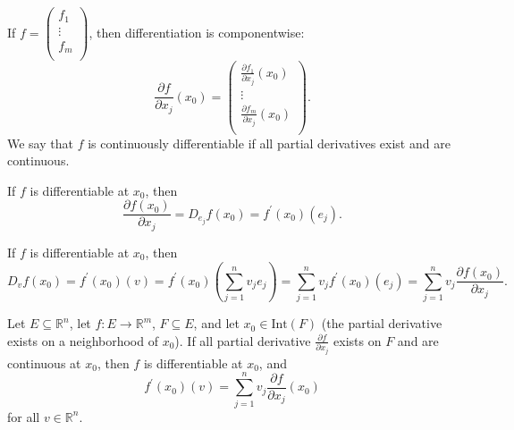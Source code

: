 \begin{remark}
    If \(f = \begin{pmatrix}
         f_1 \\
         \vdots \\
         f_m \\
    \end{pmatrix}\), then differentiation is componentwise: 
    \[
        \frac{\partial f}{\partial x_j} (x_0) = \begin{pmatrix}
             \frac{\partial f_1}{\partial x_j}(x_0)  \\
             \vdots \\
             \frac{\partial f_m}{\partial x_j} (x_0)  \\
        \end{pmatrix}. 
    \] 
    We say that \(f\) is continuously differentiable if all partial derivatives exist and are continuous. 
\end{remark}

\begin{remark}
    If \(f\) is differentiable at \(x_0\), then 
    \[
        \frac{\partial f(x_0)}{\partial x_j} = D_{e_j}f(x_0) = f^{\prime} (x_0) (e_j). 
    \]  
\end{remark}

\begin{remark}
    If \(f\) is differentiable at \(x_0\), then   
    \[
        D_v f(x_0) = f^{\prime} (x_0)(v) = f^{\prime} (x_0) \left( \sum_{j=1}^n v_j e_j  \right) = \sum_{j=1}^n v_j f^{\prime} (x_0)(e_j) = \sum_{j=1}^n v_j \frac{\partial f(x_0)}{\partial x_j}.    
    \]
\end{remark}

\begin{theorem} \label{thm: if f continuously differentiable then f differentiable}
    Let \(E \subseteq \mathbb{R} ^n\), let \(f : E \to \mathbb{R} ^m\), \(F \subseteq E\), and let \(x_0 \in \mathrm{Int}(F) \) (the partial derivative exists on a neighborhood of \(x_0\)). If all partial derivative \(\frac{\partial f}{\partial x_j} \) exists on \(F\) and are continuous at \(x_0\), then \(f\) is differentiable at \(x_0\), and 
    \[
        f^{\prime} (x_0)(v) = \sum_{j=1}^n v_j \frac{\partial f}{\partial x_j}(x_0) 
    \]         
    for all \(v \in \mathbb{R} ^n\). 
\end{theorem}

